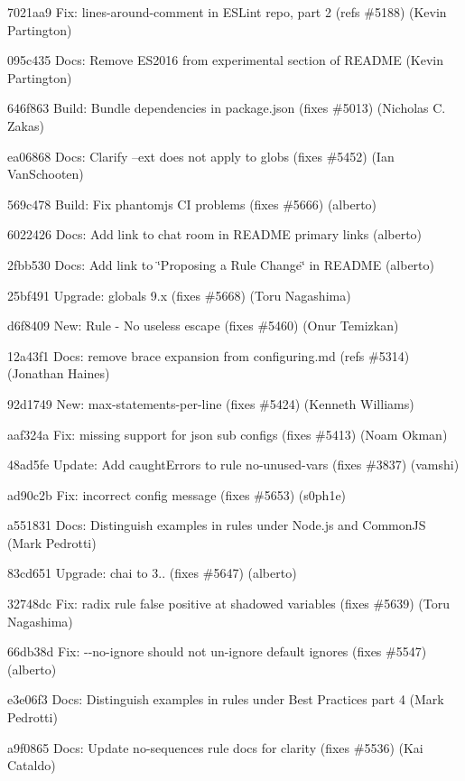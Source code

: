 \begin{DoxyItemize}
\item 7021aa9 Fix\+: lines-\/around-\/comment in E\+S\+Lint repo, part 2 (refs \#5188) (Kevin Partington)
\item 095c435 Docs\+: Remove E\+S2016 from experimental section of R\+E\+A\+D\+ME (Kevin Partington)
\item 646f863 Build\+: Bundle dependencies in package.\+json (fixes \#5013) (Nicholas C. Zakas)
\item ea06868 Docs\+: Clarify --ext does not apply to globs (fixes \#5452) (Ian Van\+Schooten)
\item 569c478 Build\+: Fix phantomjs CI problems (fixes \#5666) (alberto)
\item 6022426 Docs\+: Add link to chat room in R\+E\+A\+D\+ME primary links (alberto)
\item 2fbb530 Docs\+: Add link to \char`\"{}\+Proposing a Rule Change\char`\"{} in R\+E\+A\+D\+ME (alberto)
\item 25bf491 Upgrade\+: globals 9.\+x (fixes \#5668) (Toru Nagashima)
\item d6f8409 New\+: Rule -\/ No useless escape (fixes \#5460) (Onur Temizkan)
\item 12a43f1 Docs\+: remove brace expansion from configuring.\+md (refs \#5314) (Jonathan Haines)
\item 92d1749 New\+: max-\/statements-\/per-\/line (fixes \#5424) (Kenneth Williams)
\item aaf324a Fix\+: missing support for json sub configs (fixes \#5413) (Noam Okman)
\item 48ad5fe Update\+: Add \textquotesingle{}caught\+Errors\textquotesingle{} to rule no-\/unused-\/vars (fixes \#3837) (vamshi)
\item ad90c2b Fix\+: incorrect config message (fixes \#5653) (s0ph1e)
\item a551831 Docs\+: Distinguish examples in rules under Node.\+js and Common\+JS (Mark Pedrotti)
\item 83cd651 Upgrade\+: chai to 3.. (fixes \#5647) (alberto)
\item 32748dc Fix\+: {\ttfamily radix} rule false positive at shadowed variables (fixes \#5639) (Toru Nagashima)
\item 66db38d Fix\+: {\ttfamily -\/-\/no-\/ignore} should not un-\/ignore default ignores (fixes \#5547) (alberto)
\item e3e06f3 Docs\+: Distinguish examples in rules under Best Practices part 4 (Mark Pedrotti)
\item a9f0865 Docs\+: Update no-\/sequences rule docs for clarity (fixes \#5536) (Kai Cataldo)

\end{DoxyItemize}
